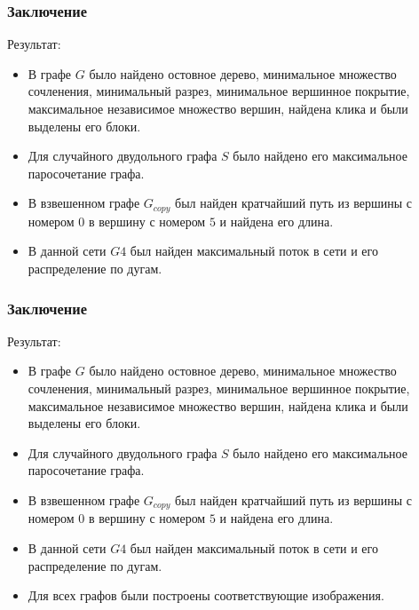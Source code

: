 \documentclass[c]{beamer}  %
\begin{document}
 \begin{frame}
\frametitle{Заключение}
\begin{block}{Результат:} 
\begin{itemize}
\footnotesize
    \item В графе $G$ было найдено остовное дерево, минимальное множество сочленения, минимальный разрез, минимальное вершинное покрытие, максимальное независимое множество вершин, найдена клика и были выделены его блоки.

    \item Для случайного двудольного графа $S$ было найдено его максимальное паросочетание графа.

    \item В взвешенном графе $G_{copy}$ был найден кратчайший путь из вершины с номером $0$ в вершину с номером $5$ и найдена его длина.

    \item В данной сети $G4$ был найден максимальный поток в сети и его распределение по дугам.

\end{itemize}	
\end{block}
 \end{frame}
 \begin{frame}
\frametitle{Заключение}
 \begin{block}{Результат:} 
\begin{itemize}
\footnotesize
    \item В графе $G$ было найдено остовное дерево, минимальное множество сочленения, минимальный разрез, минимальное вершинное покрытие, максимальное независимое множество вершин, найдена клика и были выделены его блоки.

    \item Для случайного двудольного графа $S$ было найдено его максимальное паросочетание графа.

    \item В взвешенном графе $G_{copy}$ был найден кратчайший путь из вершины с номером $0$ в вершину с номером $5$ и найдена его длина.

    \item В данной сети $G4$ был найден максимальный поток в сети и его распределение по дугам.

    \item Для всех графов были построены соответствующие изображения.
\end{itemize}	
\end{block}
 \end{frame}
 
\end{document}
